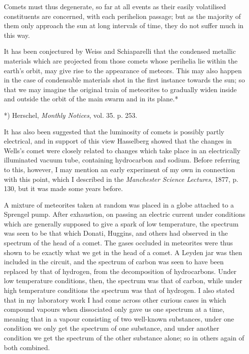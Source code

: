 \documentclass[a4paper, 12pt, oneside, polutonikogreek, english]{article}
\begin{document}
Comets must thus degenerate, so far at all events as their easily volatilised constituents are concerned, with each perihelion passage; but as the majority of them only approach the sun at long intervals of time, they do not suffer much in this way.

It has been conjectured by Weiss and Schiaparelli that the condensed metallic materials which are projected from those comets whose perihelia lie within the earth's orbit, may give rise to the appearance of meteors. This may also happen in the case of condensable materials shot in the first instance towards the sun; so that we may imagine the original train of meteorites to gradually widen inside and outside the orbit of the main swarm and in its plane.*

*) Herschel, \emph{Monthly Notices}, vol. 35. p. 253.

It has also been suggested that the luminosity of comets is possibly partly electrical, and in support of this view Hasselberg showed that the changes in Wells's comet were closely related to changes which take place in an electrically illuminated vacuum tube, containing hydrocarbon and sodium. Before referring to this, however, I may mention an early experiment of my own in connection with this point, which I described in the \emph{Manchester Science Lectures}, 1877, p. 130, but it was made some years before.

A mixture of meteorites taken at random was placed in a globe attached to a Sprengel pump. After exhaustion, on passing an electric current under conditions which are generally supposed to give a spark of low temperature, the spectrum was seen to be that which Donati, Huggins, and others had observed in the spectrum of the head of a comet. The gases occluded in meteorites were thus shown to be exactly what we get in the head of a comet. A Leyden jar was then included in the circuit, and the spectrum of carbon was seen to have been replaced by that of hydrogen, from the decomposition of hydrocarbons. Under low temperature conditions, then, the spectrum was that of carbon, while under high temperature conditions the spectrum was that of hydrogen. I also stated that in my laboratory work I had come across other curious cases in which compound vapours when dissociated only gave us one spectrum at a time, meaning that in a vapour consisting of two well-known substances, under one condition we only get the spectrum of one substance, and under another condition we get the spectrum of the other substance alone; so in others again of both combined.
\end{document}
